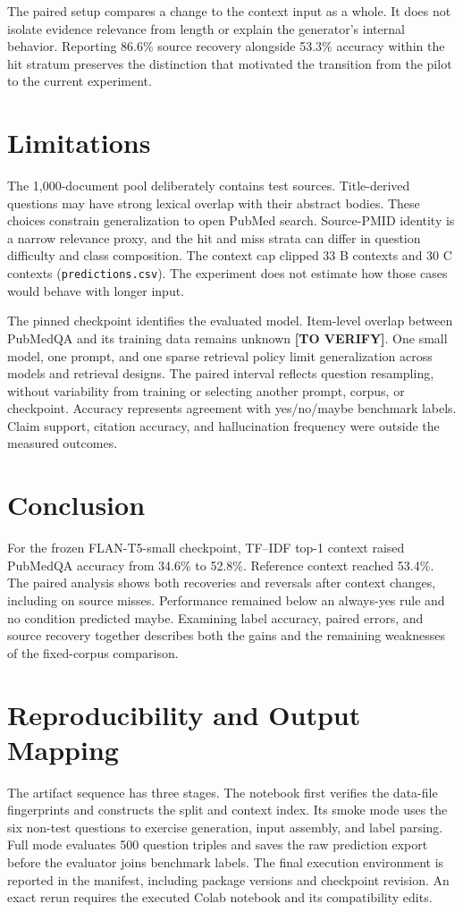 \documentclass[manuscript,nonacm]{acmart}
\begin{document}
The paired setup compares a change to the context input as a whole. It does not isolate evidence relevance from length or explain the generator's internal behavior. Reporting 86.6\% source recovery alongside 53.3\% accuracy within the hit stratum preserves the distinction that motivated the transition from the pilot to the current experiment.

\section{Limitations}
The 1,000-document pool deliberately contains test sources. Title-derived questions may have strong lexical overlap with their abstract bodies. These choices constrain generalization to open PubMed search. Source-PMID identity is a narrow relevance proxy, and the hit and miss strata can differ in question difficulty and class composition. The context cap clipped 33 B contexts and 30 C contexts (\texttt{predictions.csv}). The experiment does not estimate how those cases would behave with longer input.

The pinned checkpoint identifies the evaluated model. Item-level overlap between PubMedQA and its training data remains unknown \textbf{[TO VERIFY]}. One small model, one prompt, and one sparse retrieval policy limit generalization across models and retrieval designs. The paired interval reflects question resampling, without variability from training or selecting another prompt, corpus, or checkpoint. Accuracy represents agreement with yes/no/maybe benchmark labels. Claim support, citation accuracy, and hallucination frequency were outside the measured outcomes.

\section{Conclusion}
For the frozen FLAN-T5-small checkpoint, TF--IDF top-1 context raised PubMedQA accuracy from 34.6\% to 52.8\%. Reference context reached 53.4\%. The paired analysis shows both recoveries and reversals after context changes, including on source misses. Performance remained below an always-yes rule and no condition predicted maybe. Examining label accuracy, paired errors, and source recovery together describes both the gains and the remaining weaknesses of the fixed-corpus comparison.
\section{Reproducibility and Output Mapping}
The artifact sequence has three stages. The notebook first verifies the data-file fingerprints and constructs the split and context index. Its smoke mode uses the six non-test questions to exercise generation, input assembly, and label parsing. Full mode evaluates 500 question triples and saves the raw prediction export before the evaluator joins benchmark labels. The final execution environment is reported in the manifest, including package versions and checkpoint revision. An exact rerun requires the executed Colab notebook and its compatibility edits.
\end{document}
